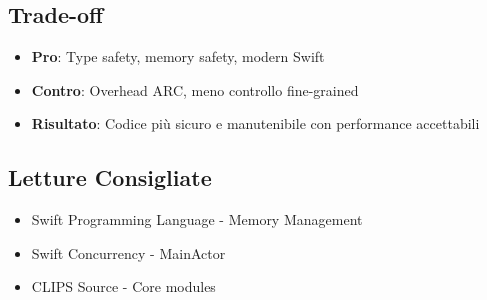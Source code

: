 \subsection{Trade-off}

\begin{itemize}
\item \textbf{Pro}: Type safety, memory safety, modern Swift
\item \textbf{Contro}: Overhead ARC, meno controllo fine-grained
\item \textbf{Risultato}: Codice più sicuro e manutenibile con performance accettabili
\end{itemize}

\subsection{Letture Consigliate}

\begin{itemize}
\item Swift Programming Language - Memory Management
\item Swift Concurrency - MainActor
\item CLIPS Source - Core modules
\end{itemize}
